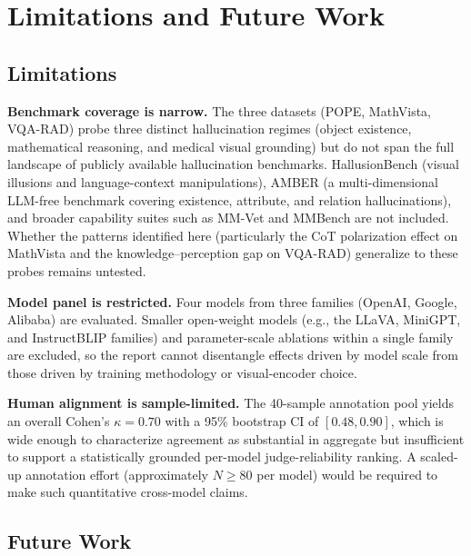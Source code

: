 \section{Limitations and Future Work}

\subsection{Limitations}

\textbf{Benchmark coverage is narrow.}
The three datasets (POPE, MathVista, VQA-RAD)
probe three distinct hallucination regimes
(object existence,
mathematical reasoning,
and medical visual grounding)
but do not span
the full landscape of publicly available hallucination benchmarks.
HallusionBench \citep{guanHallusionBenchAdvancedDiagnostic2024}
(visual illusions and language-context manipulations),
AMBER \citep{wangAMBERLLMfreeMultidimensional2023}
(a multi-dimensional LLM-free benchmark
covering existence, attribute, and relation hallucinations),
and broader capability suites such as
MM-Vet \citep{yuMMVetEvaluatingLarge2024}
and MMBench \citep{liuMMBenchAllaroundPlayer2024}
are not included.
Whether the patterns identified here
(particularly
the CoT polarization effect on MathVista
and the knowledge--perception gap on VQA-RAD)
generalize
to these probes remains untested.

\textbf{Model panel is restricted.}
Four models from three families (OpenAI, Google, Alibaba)
are evaluated.
Smaller open-weight models
(e.g., the LLaVA, MiniGPT, and InstructBLIP families)
and parameter-scale ablations within a single family
are excluded,
so the report cannot disentangle effects driven by model scale
from those driven by training methodology or visual-encoder choice.

\textbf{Human alignment is sample-limited.}
The 40-sample annotation pool
yields an overall Cohen's $\kappa = 0.70$
with a 95\% bootstrap CI of $[0.48, 0.90]$,
which is wide
enough to characterize agreement as substantial in aggregate
but insufficient to support a statistically grounded
per-model judge-reliability ranking.
A scaled-up annotation effort
(approximately $N \geq 80$ per model)
would be required to make such quantitative cross-model claims.

\subsection{Future Work}

